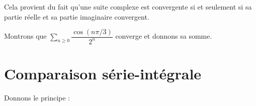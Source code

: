 \documentclass[french,11pt,twoside]{VcCours}
\newcommand{\dx}{\text{d}x}
\newcommand{\Sum}[2]{\ensuremath{\textstyle{\sum\limits_{#1}^{#2}}}}
\begin{document}
\begin{Demonstration}{} 
Cela provient du fait qu'une suite complexe est convergente si et seulement si sa partie réelle et sa partie imaginaire convergent.
\end{Demonstration}

\begin{Exemple} Montrons que $\Sum{n \geq 0}{} \dfrac{\cos(n \pi/3)}{2^n}$ converge et donnons sa somme.

	\newpage
\vspace*{3cm}
\end{Exemple}

\section{Comparaison série-intégrale}

Donnons le principe :

%
%
%
%
%
%
\end{document}
